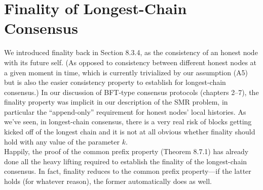 \section{Finality of Longest-Chain Consensus}
We introduced finality back in Section 8.3.4, as the consistency of an honest node with its
future self. (As opposed to consistency between different honest nodes at a given moment in
time, which is currently trivialized by our assumption (A5) but is also the easier consistency
property to establish for longest-chain consensus.) In our discussion of BFT-type consensus
protocols (chapters 2–7), the finality property was implicit in our description of the SMR
problem, in particular the “append-only” requirement for honest nodes’ local histories. As
we've seen, in longest-chain consensus, there is a very real risk of blocks getting kicked off
of the longest chain and it is not at all obvious whether finality should hold with any value
of the parameter $k$.\\
Happily, the proof of the common prefix property (Theorem 8.7.1) has already done all the
heavy lifting required to establish the finality of the longest-chain consensus. In fact, finality
reduces to the common prefix property—if the latter holds (for whatever reason), the former
automatically does as well.\\




